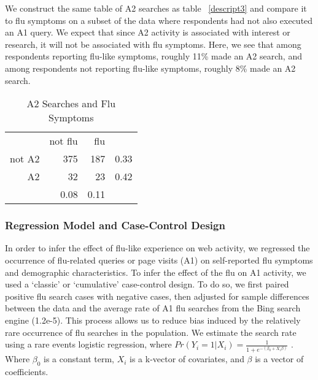 \documentclass[12pt]{article}
\begin{document}
We construct the same table of A2 searches as table ~\ref{descript3} and compare it to flu symptoms on a subset of the data where respondents had not also executed an A1 query. We expect that since A2 activity is associated with interest or research, it will not be associated with flu symptoms. Here, we see that among respondents reporting flu-like symptoms, roughly 11\% made an A2 search, and among respondents not reporting flu-like symptoms, roughly 8\% made an A2 search.

\begin{table}[!htbp]
\centering
  \caption{A2 Searches and Flu Symptoms}
  \label{descript4}
\begin{tabular}{rrrr}
  \hline
    & not flu &  flu & \\
not A2 & 375 & 187 & 0.33 \\
A2 & 32 & 23 & 0.42 \\
   \hline
   & 0.08 & 0.11 & \\
   \hline
\end{tabular}
\end{table}



\subsubsection{Regression Model and Case-Control Design}

In order to infer the effect of flu-like experience on web activity, we regressed the occurrence of flu-related queries or page visits (A1) on self-reported flu symptoms and demographic characteristics. To infer the effect of the flu on A1 activity, we used a `classic' or `cumulative' case-control design. To do so, we first paired positive flu search cases with negative cases, then adjusted for sample differences between the data and the average rate of A1 flu searches from the Bing search engine (1.2e-5). This process allows us to reduce bias induced by the relatively rare occurrence of flu searches in the population. We estimate the search rate using a rare events logistic regression, where $Pr(Y_i=1|X_i) = \frac{1}{1+e^{ - (\beta_0 + X_i \beta ) }}$ . Where $\beta_0$ is a constant term, $X_i$ is a k-vector of covariates, and $\beta$ is a vector of coefficients.
\end{document}
